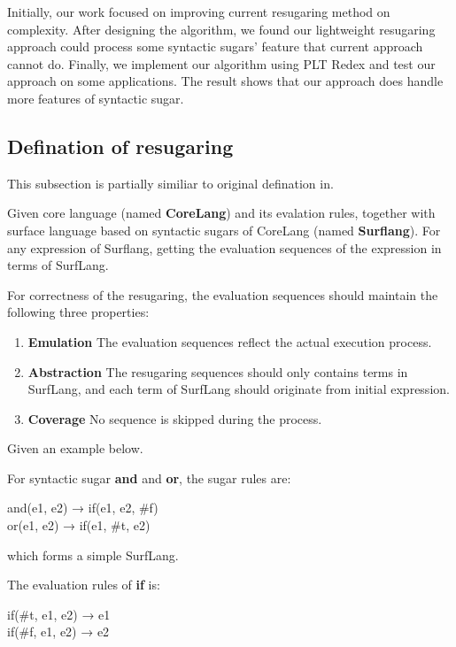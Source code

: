 Initially, our work focused on improving current resugaring method on complexity. After designing the algorithm, we found our lightweight resugaring approach could process some syntactic sugars' feature that current approach cannot do. Finally, we implement our algorithm using PLT Redex\cite{SEwPR} and test our approach on some applications. The result shows that our approach does handle more features of syntactic sugar.

\subsection{Defination of resugaring}
This subsection is partially similiar to original defination in\cite{resugaring}.
\begin{Def}[Resugaring]
Given core language (named {\bfseries CoreLang}) and its evalation rules, together with surface language based on syntactic sugars of CoreLang (named {\bfseries Surflang}). For any expression of Surflang, getting the evaluation sequences of the expression in terms of SurfLang. 
\end{Def}
For correctness of the resugaring, the evaluation sequences should maintain the following three properties:
\begin{enumerate}
\item {\bfseries Emulation} The evaluation sequences reflect the actual execution process.
\item {\bfseries Abstraction} The resugaring sequences should only contains terms in SurfLang, and each term of SurfLang should originate from initial expression.
\item {\bfseries Coverage} No sequence is skipped during the process.
\end{enumerate}

Given an example below.

For syntactic sugar {\bfseries and} and {\bfseries or}, the sugar rules are:
\begin{center}
	\parbox[t]{\textwidth}{%
		\begin{center}  
			and(e1, e2) → if(e1, e2, \#f)\\
			or(e1, e2) → if(e1, \#t, e2)
		\end{center}  
	}%
\end{center}
which forms a simple SurfLang.

The evaluation rules of {\bfseries if} is:
\begin{center}
	\parbox[t]{\textwidth}{%
		\begin{center}  
			if(\#t, e1, e2) → e1\\
			if(\#f, e1, e2) → e2
		\end{center}  
	}%
\end{center}

